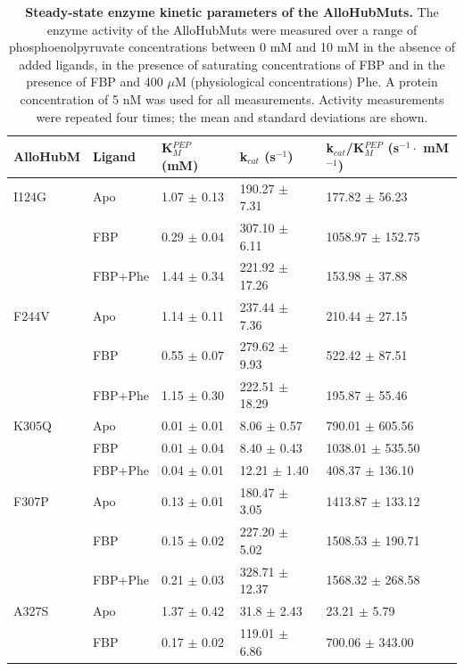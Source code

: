 %
%
\clearpage
%
%
\begin{table}[!ht]
\centering
\caption[Steady-state enzyme kinetic parameters of the AlloHubMuts.]{\textbf{Steady-state enzyme kinetic parameters of the AlloHubMuts.} The enzyme activity of the AlloHubMuts were measured over a range of phosphoenolpyruvate concentrations between 0 mM and 10 mM in the absence of added ligands, in the presence of saturating concentrations of FBP and in the presence of FBP and 400 $\mu$M (physiological concentrations) Phe. A protein concentration of 5 nM was used for all measurements. Activity measurements were repeated four times; the mean and standard deviations are shown.}
\begin{tabular}{@{}lllll@{}}
\toprule
AlloHubM & Ligand & K$_{M}^{PEP}$ (mM) & k$_{cat}$ (s$^{-1}$) & k$_{cat}$/K$_{M}^{PEP}$ (s$^{-1}\cdot$ mM$^{-1}$) \\ \midrule
I124G & Apo & 1.07 $\pm$ 0.13 & 190.27 $\pm$ 7.31 & 177.82 $\pm$ 56.23 \\
 & FBP & 0.29 $\pm$ 0.04 & 307.10 $\pm$ 6.11 & 1058.97 $\pm$ 152.75 \\
 & FBP+Phe & 1.44 $\pm$ 0.34 & 221.92 $\pm$ 17.26 & 153.98 $\pm$ 37.88 \\\midrule
F244V & Apo & 1.14 $\pm$ 0.11 & 237.44 $\pm$ 7.36 & 210.44 $\pm$ 27.15 \\
 & FBP & 0.55 $\pm$ 0.07 & 279.62 $\pm$ 9.93 & 522.42 $\pm$ 87.51 \\
 & FBP+Phe & 1.15 $\pm$ 0.30 & 222.51 $\pm$ 18.29 & 195.87 $\pm$ 55.46 \\\midrule
K305Q & Apo & 0.01 $\pm$ 0.01 & 8.06 $\pm$ 0.57 & 790.01 $\pm$ 605.56 \\
 & FBP & 0.01 $\pm$ 0.04 & 8.40 $\pm$ 0.43 & 1038.01 $\pm$ 535.50 \\
 & FBP+Phe & 0.04 $\pm$ 0.01 & 12.21 $\pm$ 1.40 & 408.37 $\pm$ 136.10 \\\midrule
F307P & Apo & 0.13 $\pm$ 0.01 & 180.47 $\pm$ 3.05 & 1413.87 $\pm$ 133.12 \\
 & FBP & 0.15 $\pm$ 0.02 & 227.20 $\pm$ 5.02 & 1508.53 $\pm$ 190.71 \\
 & FBP+Phe & 0.21 $\pm$ 0.03 & 328.71 $\pm$ 12.37 & 1568.32 $\pm$ 268.58 \\\midrule
A327S & Apo & 1.37 $\pm$ 0.42 & 31.8 $\pm$ 2.43 & 23.21 $\pm$ 5.79 \\
 & FBP & 0.17 $\pm$ 0.02 & 119.01 $\pm$ 6.86 & 700.06 $\pm$ 343.00 \\

\end{tabular}
\end{table}
